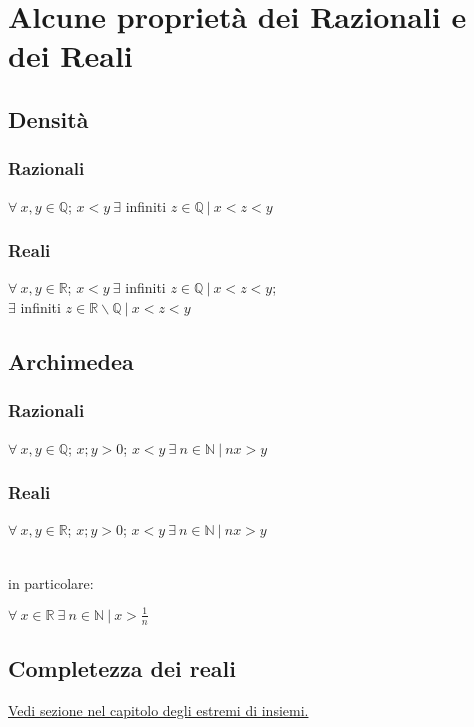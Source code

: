 \chapter{Alcune proprietà dei Razionali e dei Reali}
\section{Densità}
\subsection{Razionali}
\begin{Large}
$\forall\ x,y \in \mathbb{Q}$; $x<y\ \exists$ infiniti $z \in \mathbb{Q}\ |\ x<z<y$
\end{Large}
\subsection{Reali}
\begin{Large}
$\forall\ x,y \in \mathbb{R}$; $x<y\ \exists$ infiniti $z \in \mathbb{Q}\ |\ x<z<y$;\\
$\exists$ infiniti $z \in \mathbb{R} \backslash \mathbb{Q}\ |\ x<z<y$
\end{Large}

\section{Archimedea}
\subsection{Razionali}
\begin{Large}
$\forall\ x,y \in \mathbb{Q}$; $x;y > 0$; $x<y\ \exists\ n \in \mathbb{N}\ |\ nx>y$
\end{Large}
\subsection{Reali}
\begin{Large}
$\forall\ x,y \in \mathbb{R}$; $x;y > 0$; $x<y\ \exists\ n \in \mathbb{N}\ |\ nx>y$
\end{Large}\\
in particolare:\\
\begin{Large}
$\forall\ x \in \mathbb{R}\ \exists\ n \in \mathbb{N}\ |\ x>\frac{1}{n}$
\end{Large}

\section{Completezza dei reali}
\hyperref[sec: CompletezzaReali]{Vedi sezione nel capitolo degli estremi di insiemi.}